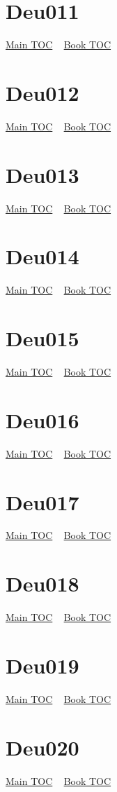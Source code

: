 \documentclass{book}
\begin{document}
  \section{Deu011}\hyperlink{toc}{Main TOC} ~ \hyperref[subsec:Deu]{Book TOC} 
  \section{Deu012}\hyperlink{toc}{Main TOC} ~ \hyperref[subsec:Deu]{Book TOC} 
  \section{Deu013}\hyperlink{toc}{Main TOC} ~ \hyperref[subsec:Deu]{Book TOC} 
  \section{Deu014}\hyperlink{toc}{Main TOC} ~ \hyperref[subsec:Deu]{Book TOC} 
  \section{Deu015}\hyperlink{toc}{Main TOC} ~ \hyperref[subsec:Deu]{Book TOC} 
  \section{Deu016}\hyperlink{toc}{Main TOC} ~ \hyperref[subsec:Deu]{Book TOC} 
  \section{Deu017}\hyperlink{toc}{Main TOC} ~ \hyperref[subsec:Deu]{Book TOC} 
  \section{Deu018}\hyperlink{toc}{Main TOC} ~ \hyperref[subsec:Deu]{Book TOC} 
  \section{Deu019}\hyperlink{toc}{Main TOC} ~ \hyperref[subsec:Deu]{Book TOC} 
  \section{Deu020}\hyperlink{toc}{Main TOC} ~ \hyperref[subsec:Deu]{Book TOC} 
\end{document}
